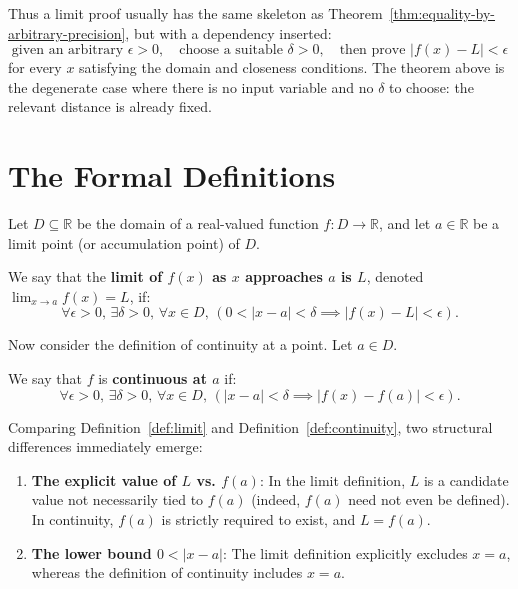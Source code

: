 \documentclass{essay}
\begin{document}
Thus a limit proof usually has the same skeleton as Theorem~\ref{thm:equality-by-arbitrary-precision}, but with a dependency inserted:
\[ \text{given an arbitrary }\epsilon>0, \quad \text{choose a suitable }\delta>0, \quad \text{then prove } |f(x)-L|<\epsilon \]
for every \(x\) satisfying the domain and closeness conditions. The theorem above is the degenerate case where there is no input variable and no \(\delta\) to choose: the relevant distance is already fixed.

\section{The Formal Definitions}

Let \(D \subseteq \mathbb{R}\) be the domain of a real-valued function \(f: D \to \mathbb{R}\), and let \(a \in \mathbb{R}\) be a limit point (or accumulation point) of \(D\).

\begin{definition}
  \label{def:limit}
  We say that the \textbf{limit of \(f(x)\) as \(x\) approaches \(a\) is \(L\)}, denoted \(\lim_{x \to a} f(x) = L\), if:
  \[ \forall \epsilon > 0, \, \exists \delta > 0, \, \forall x \in D, \, \left( 0 < |x - a| < \delta \implies |f(x) - L| < \epsilon \right). \]
\end{definition}

Now consider the definition of continuity at a point. Let \(a \in D\).

\begin{definition}
  \label{def:continuity}
  We say that \(f\) is \textbf{continuous at \(a\)} if:
  \[ \forall \epsilon > 0, \, \exists \delta > 0, \, \forall x \in D, \, \left( |x - a| < \delta \implies |f(x) - f(a)| < \epsilon \right). \]
\end{definition}

Comparing Definition~\ref{def:limit} and Definition~\ref{def:continuity}, two structural differences immediately emerge:
\begin{enumerate}
  \item \textbf{The explicit value of \(L\) vs. \(f(a)\)}: In the limit definition, \(L\) is a candidate value not necessarily tied to \(f(a)\) (indeed, \(f(a)\) need not even be defined). In continuity, \(f(a)\) is strictly required to exist, and \(L = f(a)\).
  \item \textbf{The lower bound \(0 < |x - a|\)}: The limit definition explicitly excludes \(x = a\), whereas the definition of continuity includes \(x = a\).
\end{enumerate}
\end{document}
